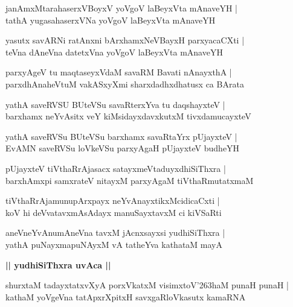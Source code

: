 \documentclass[twoside,12pt,openright]{book}
\def\S{\char'263}
\newcounter{shloka}[chapter]
\def\uvaca#1{\centerline{{\large\textbf{#1}}}}
\begin{document}
\begin{shloka}
janAmxMtarahaserxVBoyxV yoVgoV laBeyxVta mAnaveYH |\\
tathA yugasahaserxVNa yoVgoV laBeyxVta mAnaveYH 
\end{shloka}

\begin{shloka}
yasutx savARNi ratAnxni bArxhamxNeVBayxH parxyacaCXti |\\
teVna dAneVna datetxVna yoVgoV laBeyxVta mAnaveYH 
\end{shloka}

\begin{shloka}
parxyAgeV tu maqtaseyxVdaM savaRM Bavati nAnayxthA |\\
parxdhAnaheVtuM vakASxyXmi sharxdadhxdhatusx ca BArata
\end{shloka}

\begin{shloka}
yathA saveRVSU BUteVSu savaRterxYva tu daqshayxteV |\\
barxhamx neYvAsitx veY kiMsidayxdavxkutxM tivxdamucayxteV 
\end{shloka}

\begin{shloka}
yathA saveRVSu BUteVSu barxhamx savaRtaYrx pUjayxteV |\\
EvAMN saveRVSu loVkeVSu parxyAgaH pUjayxteV budheYH 
\end{shloka}

\begin{shloka}
pUjayxteV tiVthaRrAjasacx satayxmeVtaduyxdhiSiThxra |\\
barxhAmxpi samxrateV nitayxM parxyAgaM tiVthaRmutatxmaM 
\end{shloka}

\begin{shloka}
tiVthaRrAjamunupArxpayx neYvAnayxtikxMcidicaCxti |\\
koV hi deVvatavxmAsAdayx manuSayxtavxM ci kiVSaRti 
\end{shloka}

\begin{shloka}
aneVneYvAnumAneVna tavxM jAcnxsayxsi yudhiSiThxra |\\
yathA puNayxmapuNAyxM vA tatheYva kathataM mayA 
\end{shloka}

\uvaca{|| yudhiSiThxra uvAca ||}

\begin{shloka}
shurxtaM tadayxtatxvXyA porxVkatxM visimxtoV\S haM punaH punaH |\\
kathaM yoVgeVna tatApxrXpitxH savxgaRloVkasutx kamaRNA
\end{shloka}
\end{document}
